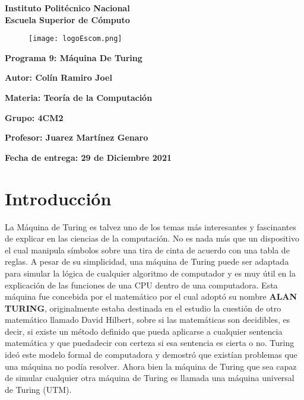 \documentclass{article}
\begin{document}
	\begin{titlepage}
		\begin{center}
			{\huge\textbf{Instituto Politécnico Nacional}}\\
			\vspace{7mm}
			{\huge\textbf{Escuela Superior de Cómputo}}\\			
			\begin{figure}[h]
				\centering
				\texttt{[image: logoEscom.png]}
			\end{figure}	
			\vspace{1cm}
			{\huge\textbf{Programa 9: Máquina De Turing}}
			\par\vspace{2cm}
			\large\textbf{Autor: Colín Ramiro Joel}
			\par\vspace{1cm}
			{\large\textbf{Materia: Teoría de la Computación}}
			\par\vspace{1cm}
			{\large\textbf{Grupo: 4CM2}}
			\par\vspace{1cm}
			{\large\textbf{Profesor: Juarez Martínez Genaro}}
			\par\vspace{1cm}
			{\large\textbf{Fecha de entrega: {\huge{29 de Diciembre 2021}}}}
			\par\vspace{3cm}
		\end{center}
	\end{titlepage}
	
	\section*{Introducción}
	La Máquina de Turing es talvez uno de los temas más interesantes y fascinantes de explicar en las ciencias de la computación. No es nada más que un dispositivo el cual manipula símbolos sobre una tira de cinta de acuerdo con una tabla de reglas. A pesar de su simplicidad, una máquina de Turing puede ser adaptada para simular la lógica de cualquier algoritmo de computador y es muy útil en la explicación de las funciones de una CPU dentro de una computadora. Esta máquina fue concebida por el matemático por el cual adoptó su nombre \textbf{ALAN TURING}, originalmente estaba destinada en el estudio la cuestión de otro matemático llamado David Hilbert, sobre si las matemáticas son decidibles, es decir, si existe un método definido que pueda aplicarse a cualquier sentencia matemática y que puedadecir con certeza si esa sentencia es cierta o no. Turing ideó este modelo formal de computadora y demostró que existían problemas que una máquina no podía resolver.
	Ahora bien la máquina de Turing que sea capaz de simular cualquier otra máquina de Turing es llamada una máquina universal de Turing (UTM).
	
\end{document}
